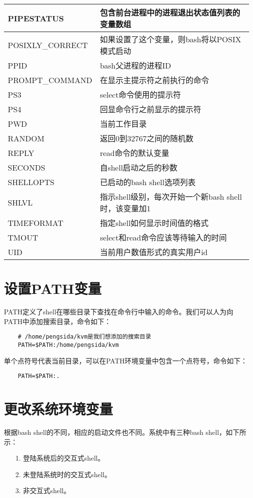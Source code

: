 \documentclass[a4paper,left=2.5cm,right=2.5cm,11pt]{article}
\begin{document}
\begin{longtable}{p{3cm}p{9cm}}
	PIPESTATUS & 包含前台进程中的进程退出状态值列表的变量数组 \\
	\hline
	POSIXLY\_CORRECT & 如果设置了这个变量，则bash将以POSIX模式启动 \\
	\hline
	PPID & bash父进程的进程ID \\
	\hline
	PROMPT\_COMMAND & 在显示主提示符之前执行的命令 \\
	\hline
	PS3 & select命令使用的提示符 \\
	\hline
	PS4 & 回显命令行之前显示的提示符 \\
	\hline
	PWD & 当前工作目录 \\
	\hline
	RANDOM & 返回0到32767之间的随机数 \\
	\hline
	REPLY & read命令的默认变量 \\
	\hline
	SECONDS & 自shell启动之后的秒数 \\
	\hline
	SHELLOPTS & 已启动的bash shell选项列表 \\
	\hline
	SHLVL & 指示shell级别，每次开始一个新bash shell时，该变量加1 \\
	\hline
	TIMEFORMAT & 指定shell如何显示时间值的格式 \\
	\hline
	TMOUT & select和read命令应该等待输入的时间 \\
	\hline
	UID & 当前用户数值形式的真实用户id \\
	\hline
	\end{longtable}

\section{设置PATH变量}
	PATH定义了shell在哪些目录下查找在命令行中输入的命令。我们可以人为向PATH中添加搜索目录，命令如下：
	\begin{lstlisting}
	# /home/pengsida/kvm是我们想添加的搜索目录
	PATH=$PATH:/home/pengsida/kvm
	\end{lstlisting}

	单个点符号代表当前目录，可以在PATH环境变量中包含一个点符号，命令如下：
	\begin{lstlisting}
	PATH=$PATH:.
	\end{lstlisting}

\section{更改系统环境变量}
	根据bash shell的不同，相应的启动文件也不同。系统中有三种bash shell，如下所示：
	\begin{itemize}
		\item[1.] 登陆系统后的交互式shell。
		\item[2.] 未登陆系统时的交互式shell。
		\item[3.] 非交互式shell。
	\end{itemize}
\end{document}
